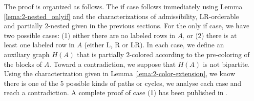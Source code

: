 \documentclass[12pt]{book}
\theoremstyle{plain}
\newcounter{cases}
\theoremstyle{remark}
\begin{document}
The proof is organized as follows. The if case follows immediately using Lemma \ref{lema:2-nested_onlyif} and the characterizations of admissibility, LR-orderable and partially $2$-nested given in the previous sections. 
For the only if case, we have two possible cases: (1) either there are no labeled rows in $A$, or (2) there is at least one labeled row in $A$ (either L, R or LR).
	In each case, we define an auxiliary graph $H(A)$ that is partially $2$-colored according to the pre-coloring of the blocks of $A$. Toward a contradiction, we suppose that $H(A)$ is not bipartite. Using the characterization given in Lemma \ref{lema:2-color-extension}, we know there is one of the $5$ possible kinds of paths or cycles, we analyse each case and reach a contradiction.
	A complete proof of case (1) has been published in \cite{PDGS19}.
\end{document}
